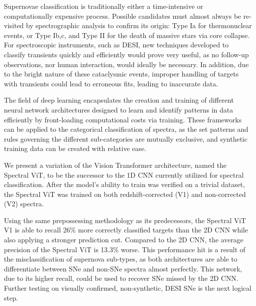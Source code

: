 

Supernovae classification is traditionally either a time-intensive or computationally
expensive process. Possible candidates must almost always be re-visited by spectrographic 
analysis to confirm its origin: Type Ia for thermonuclear events, or Type Ib,c, and Type II for the 
death of massive stars via core collapse. For spectroscopic instruments, such as DESI, new 
techniques developed to classify transients quickly and efficiently would prove very useful, 
as no follow-up observations, nor human interaction, would ideally be necessary. In addition, 
due to the bright nature of these cataclysmic events, improper handling of targets with transients 
could lead to erroneous fits, leading to inaccurate data. 

The field of deep learning encapsulates the creation and training of different neural network 
architectures designed to learn and identify patterns in data efficiently by front-loading 
computational costs via training. These frameworks can be applied to the categorical classification 
of spectra, as the set patterns and rules governing the different sub-categories are mutually exclusive, 
and synthetic training data can be created with relative ease. 

We present a variation of the Vision Transformer architecture, named the Spectral ViT, to 
be the successor to the 1D CNN currently utilized for spectral classification. After the model's 
ability to train was verified on a trivial dataset, the Spectral ViT was trained on both 
redshift-corrected (V1) and non-corrected (V2) spectra. 

Using the same prepossessing methodology as its predecessors, the Spectral ViT V1 is able to recall 
26\% more correctly classified targets than the 2D CNN while also applying a stronger prediction cut. Compared to the 2D CNN, the average precision of the Spectral ViT is
13.3\% worse. This performance hit is a result of the misclassification of supernova sub-types, 
as both architectures are able to differentiate between SNe and non-SNe spectra almost perfectly. This 
network, due to its higher recall, could be used to recover SNe missed by the 2D CNN. Further testing on visually confirmed, non-synthetic, DESI SNe is the next logical step. 

